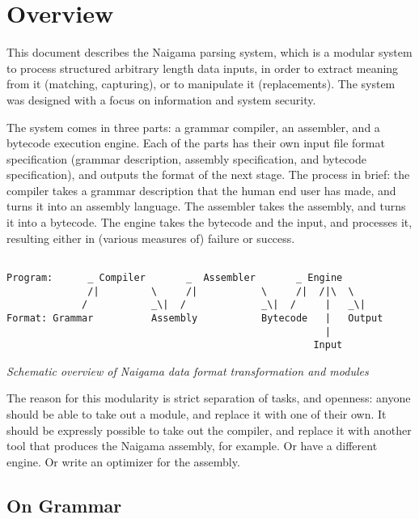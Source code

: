 \section{Overview}

This document describes the Naigama parsing system, which is a 
modular system to process structured arbitrary length data inputs,
in order to extract meaning from it (matching, capturing), or to
manipulate it (replacements).
The system was designed with a focus on information and system security.

The system comes in three parts: a grammar compiler, an assembler,
and a bytecode execution engine. Each of the parts has their own
input file format specification (grammar description, assembly specification,
and bytecode specification), and outputs the format of the next stage.
The process in brief: the compiler takes a
grammar description that the human end user has made, and turns it into
an assembly language. The assembler takes the assembly, and turns it
into a bytecode. The engine takes the bytecode and the input, and
processes it, resulting either in (various measures of) failure or
success.

\begin{myquote}
\begin{verbatim}

Program:      _ Compiler       _  Assembler       _ Engine
              /|         \     /|           \     /|  /|\  \
             /           _\|  /             _\|  /     |   _\|
Format: Grammar          Assembly           Bytecode   |   Output
                                                       |
                                                     Input

\end{verbatim}
\end{myquote}
\textit{Schematic overview of Naigama data format transformation and modules}

The reason for this modularity is strict separation of tasks, and openness:
anyone should be able to take out a module, and replace it with one
of their own.
It should be expressly possible to take out the compiler, and replace
it with another tool that produces the Naigama assembly, for example.
Or have a different engine. Or write an optimizer for the assembly.

\subsection{On Grammar}
  
